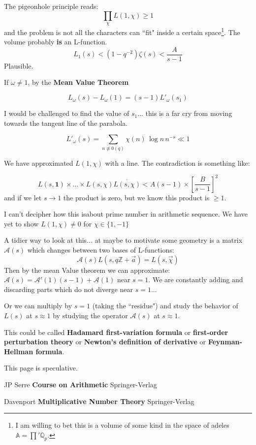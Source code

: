 \documentclass[12pt]{article}
\begin{document}
\noindent The pigeonhole principle reads:
$$ \prod_\chi L(1, \chi) \geq 1 $$  
and the problem is not all the characters can ``fit" inside a certain space\footnote{I am willing to bet this is a volume of some kind in the space of adeles $\mathbb{A} = \prod' \mathbb{Q}_p$.}.  The volume probably \textbf{is} an L-function.  
$$ L_1(s) < (1 - q^{-2})\zeta(s) < \frac{A}{s-1}$$
Plausible.
\newpage 

\noindent If $\omega \neq 1$, by the \textbf{Mean Value Theorem}

$$ L_\omega(s) - L_\omega(1) = (s-1)L'_\omega (s_1)$$

I would be challenged to find the value of $s_1$... this is a far cry from moving towards the tangent line of the parabola.

$$ L'_\omega(s) = \sum_{n \not \equiv 0 (q)} \chi(n) \, \log n \, n^{-s} \ll 1 $$

We have approximated $L(1, \chi)$ with a line.  The contradiction is something like:

$$ L(s, \mathbf{1})\times \dots \times L(s, \chi)\overline{L(s, \chi)} < A(s-1) \times 
\left[\frac{B}{s-1}\right]^2 $$
and if we let $s \to 1$ the product is zero, but we know this product is $\geq 1$. \newline

\noindent I can't decipher how this isabout prime number in arithmetic sequence.  We have yet to show $L(1, \chi) \neq 0$ for $\chi \in \{ 1, -1\}$  

\newpage

\noindent A tidier way to look at this... at maybe to motivate some geometry is a matrix $\mathcal{A}(s)$ which changes between two bases of L-functions:
$$ \mathcal{A}(s) L(s, q\mathbb{Z} + \vec{a}) = L(s, \vec{\chi}) $$
Then by the mean Value theorem we can approximate: $\mathcal{A}(s) = \mathcal{A}'(1)(s-1) + \mathcal{A}(1)$ near $s = 1$.  We are constantly adding and discarding parts which do not diverge near $s = 1$... \newline

\noindent Or we can multiply by $s = 1$ (taking the ``residue") and study the behavior of $L(s)$ at $s \approx 1$ by studying the operator $\mathcal{A}(s)$ at $s \approx 1$. \newline

\noindent  This could be called \textbf{Hadamard first-variation formula} or \textbf{first-order perturbation theory} or \textbf{Newton's definition of derivative} or \textbf{Feynman-Hellman formula}.  
 \newline

\noindent This page is speculative.
\newpage

\selectfont \fontsize{12}{10}\selectfont

\begin{thebibliography}{}

\item JP Serre \textbf{Course on Arithmetic} Springer-Verlag

\item Davenport \textbf{Multiplicative Number Theory} Springer-Verlag



\end{thebibliography}
\end{document}
